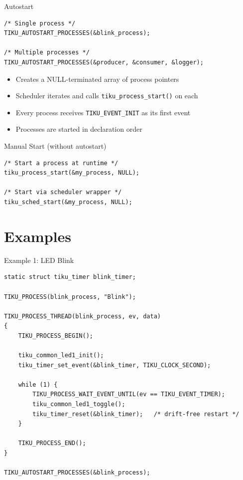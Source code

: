 \documentclass[aspectratio=169, 10pt]{beamer}
\begin{document}
\begin{frame}[fragile]{Autostart}
\begin{lstlisting}[style=cstyle, title={Register processes for autostart}]
/* Single process */
TIKU_AUTOSTART_PROCESSES(&blink_process);

/* Multiple processes */
TIKU_AUTOSTART_PROCESSES(&producer, &consumer, &logger);
\end{lstlisting}

\vspace{0.3em}
\begin{itemize}
  \item Creates a NULL-terminated array of process pointers
  \item Scheduler iterates and calls \texttt{tiku\_process\_start()} on each
  \item Every process receives \texttt{TIKU\_EVENT\_INIT} as its first event
  \item Processes are started in declaration order
\end{itemize}

\vspace{0.3em}
\begin{block}{Manual Start (without autostart)}
\begin{lstlisting}[style=cstyle]
/* Start a process at runtime */
tiku_process_start(&my_process, NULL);

/* Start via scheduler wrapper */
tiku_sched_start(&my_process, NULL);
\end{lstlisting}
\end{block}
\end{frame}

\section{Examples}

\begin{frame}[fragile]{Example 1: LED Blink}
\begin{lstlisting}[style=cstyle, title={examples/01\_blink/blink.c}]
static struct tiku_timer blink_timer;

TIKU_PROCESS(blink_process, "Blink");

TIKU_PROCESS_THREAD(blink_process, ev, data)
{
    TIKU_PROCESS_BEGIN();

    tiku_common_led1_init();
    tiku_timer_set_event(&blink_timer, TIKU_CLOCK_SECOND);

    while (1) {
        TIKU_PROCESS_WAIT_EVENT_UNTIL(ev == TIKU_EVENT_TIMER);
        tiku_common_led1_toggle();
        tiku_timer_reset(&blink_timer);   /* drift-free restart */
    }

    TIKU_PROCESS_END();
}

TIKU_AUTOSTART_PROCESSES(&blink_process);
\end{lstlisting}
\end{frame}
\end{document}
